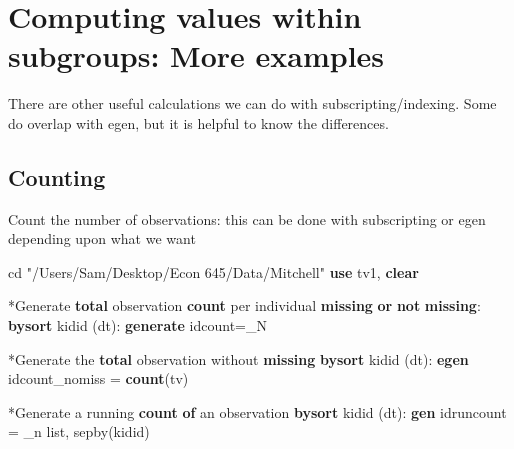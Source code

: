 \documentclass[
]{book}
\newenvironment{Shaded}{\begin{snugshade}}{\end{snugshade}}
\newcommand{\DataTypeTok}[1]{\textcolor[rgb]{0.13,0.29,0.53}{#1}}
\newcommand{\FunctionTok}[1]{\textcolor[rgb]{0.13,0.29,0.53}{\textbf{#1}}}
\newcommand{\KeywordTok}[1]{\textcolor[rgb]{0.13,0.29,0.53}{\textbf{#1}}}
\newcommand{\NormalTok}[1]{#1}
\newcommand{\OtherTok}[1]{\textcolor[rgb]{0.56,0.35,0.01}{#1}}
\newcommand{\StringTok}[1]{\textcolor[rgb]{0.31,0.60,0.02}{#1}}
\begin{document}
\section{Computing values within subgroups: More examples}\label{computing-values-within-subgroups-more-examples}

There are other useful calculations we can do with subscripting/indexing.
Some do overlap with egen, but it is helpful to know the differences.

\subsection*{Counting}\label{counting}

Count the number of observations: this can be done with subscripting or egen
depending upon what we want

\begin{Shaded}
\begin{Highlighting}[]
\NormalTok{cd }\StringTok{"/Users/Sam/Desktop/Econ 645/Data/Mitchell"}
\KeywordTok{use}\NormalTok{ tv1, }\KeywordTok{clear}

\NormalTok{*Generate }\KeywordTok{total}\NormalTok{ observation }\FunctionTok{count}\NormalTok{ per individual }\FunctionTok{missing} \KeywordTok{or} \KeywordTok{not} \FunctionTok{missing}\NormalTok{:}
\KeywordTok{bysort}\NormalTok{ kidid (dt): }\KeywordTok{generate}\NormalTok{ idcount=\_N}

\NormalTok{*Generate the }\KeywordTok{total}\NormalTok{ observation without }\FunctionTok{missing}
\KeywordTok{bysort}\NormalTok{ kidid (dt): }\KeywordTok{egen}\NormalTok{ idcount\_nomiss = }\FunctionTok{count}\NormalTok{(tv)}

\NormalTok{*Generate a running }\FunctionTok{count} \KeywordTok{of}\NormalTok{ an observation}
\KeywordTok{bysort}\NormalTok{ kidid (dt): }\KeywordTok{gen}\NormalTok{ idruncount = }\DataTypeTok{\_n}
\OtherTok{list}\NormalTok{, sepby(kidid)}
\end{Highlighting}
\end{Shaded}
\end{document}
